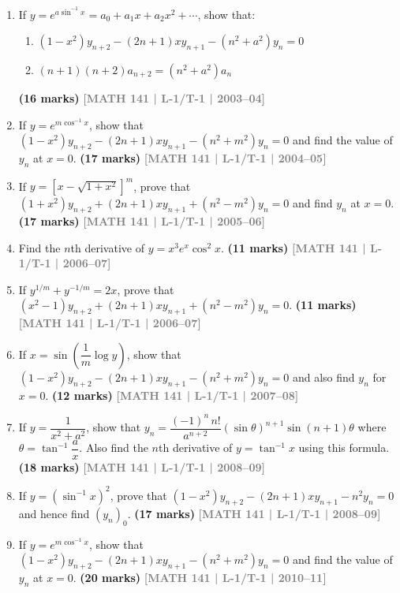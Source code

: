 \documentclass[12pt,a4paper]{article}
\newcommand{\yr}[1]{\hfill\textcolor{gray}{\small\textbf{[#1]}}}
\newcommand{\mk}[1]{\textcolor{orange!70!black}{\small\textbf{(#1 marks)}}}
\begin{document}
\begin{enumerate}

\item If $y=e^{a\sin^{-1}x}=a_{0}+a_{1}x+a_{2}x^{2}+\cdots$, show that:
\begin{enumerate}
  \item $(1-x^{2})y_{n+2}-(2n+1)xy_{n+1}-(n^{2}+a^{2})y_{n}=0$
  \item $(n+1)(n+2)a_{n+2}=(n^{2}+a^{2})a_{n}$
\end{enumerate}
\mk{16} \yr{MATH 141 | L-1/T-1 | 2003--04}

\item If $y=e^{m\cos^{-1}x}$, show that $(1-x^{2})y_{n+2}-(2n+1)xy_{n+1}-(n^{2}+m^{2})y_{n}=0$ and find the value of $y_{n}$ at $x=0$.
\mk{17} \yr{MATH 141 | L-1/T-1 | 2004--05}

\item If $y=[x-\sqrt{1+x^{2}}]^{m}$, prove that $(1+x^{2})y_{n+2}+(2n+1)xy_{n+1}+(n^{2}-m^{2})y_{n}=0$ and find $y_{n}$ at $x=0$.
\mk{17} \yr{MATH 141 | L-1/T-1 | 2005--06}

\item Find the $n$th derivative of $y=x^{3}e^{x}\cos^{2}x$.
\mk{11} \yr{MATH 141 | L-1/T-1 | 2006--07}

\item If $y^{1/m}+y^{-1/m}=2x$, prove that $(x^{2}-1)y_{n+2}+(2n+1)xy_{n+1}+(n^{2}-m^{2})y_{n}=0$.
\mk{11} \yr{MATH 141 | L-1/T-1 | 2006--07}

\item If $x=\sin\!\left(\dfrac{1}{m}\log y\right)$, show that $(1-x^{2})y_{n+2}-(2n+1)xy_{n+1}-(n^{2}+m^{2})y_{n}=0$ and also find $y_{n}$ for $x=0$.
\mk{12} \yr{MATH 141 | L-1/T-1 | 2007--08}

\item If $y=\dfrac{1}{x^{2}+a^{2}}$, show that $y_{n}=\dfrac{(-1)^{n}\,n!}{a^{n+2}}(\sin\theta)^{n+1}\sin(n+1)\theta$ where $\theta=\tan^{-1}\!\dfrac{a}{x}$. Also find the $n$th derivative of $y=\tan^{-1}x$ using this formula.
\mk{18} \yr{MATH 141 | L-1/T-1 | 2008--09}

\item If $y=(\sin^{-1}x)^{2}$, prove that $(1-x^{2})y_{n+2}-(2n+1)xy_{n+1}-n^{2}y_{n}=0$ and hence find $(y_{n})_{0}$.
\mk{17} \yr{MATH 141 | L-1/T-1 | 2008--09}

\item If $y=e^{m\cos^{-1}x}$, show that $(1-x^{2})y_{n+2}-(2n+1)xy_{n+1}-(n^{2}+m^{2})y_{n}=0$ and find the value of $y_{n}$ at $x=0$.
\mk{20} \yr{MATH 141 | L-1/T-1 | 2010--11}


\end{enumerate}
\end{document}
